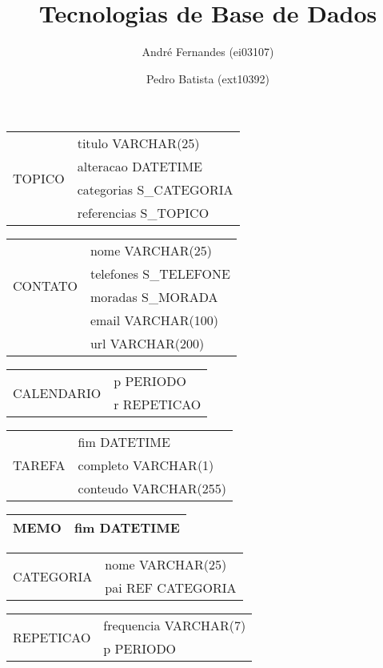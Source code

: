 \documentclass[a4paper,12pt]{article}
\title{Tecnologias de Base de Dados}
\author{André Fernandes (ei03107) \and Pedro Batista (ext10392)}
\begin{document}
\maketitle

\begin{tabular}{|c|l|} \hline
\multirow{4}{*}{TOPICO}
& titulo VARCHAR(25) \\
& alteracao DATETIME \\ 
& categorias S\_CATEGORIA \\
& referencias S\_TOPICO\\ \hline 
\end{tabular}

\begin{tabular}{|c|l|} \hline
\multirow{4}{*}{CONTATO}
& nome VARCHAR(25) \\
& telefones S\_TELEFONE \\ 
& moradas S\_MORADA \\
& email VARCHAR(100) \\ 
& url VARCHAR(200) \\ \hline 
\end{tabular}

\begin{tabular}{|c|l|} \hline
\multirow{2}{*}{CALENDARIO}
& p PERIODO \\
& r REPETICAO \\ \hline 
\end{tabular}

\begin{tabular}{|c|l|} \hline
\multirow{3}{*}{TAREFA}
& fim DATETIME \\
& completo VARCHAR(1) \\ 
& conteudo VARCHAR(255) \\ \hline 
\end{tabular}

\begin{tabular}{|c|l|} \hline
MEMO & fim DATETIME \\ \hline
\end{tabular}

\begin{tabular}{|c|l|} \hline
\multirow{2}{*}{CATEGORIA}
& nome VARCHAR(25) \\
& pai REF CATEGORIA \\ \hline 
\end{tabular}

\begin{tabular}{|c|l|} \hline
\multirow{2}{*}{REPETICAO}
& frequencia VARCHAR(7) \\
& p PERIODO \\ \hline 
\end{tabular}
\end{document}
